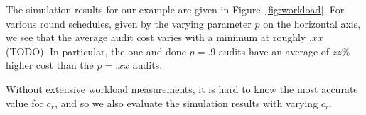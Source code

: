 The simulation results for our example are given in Figure~\ref{fig:workload}. 
For various round schedules, given by the varying parameter $p$ on the horizontal axis, we see that the average audit cost varies with a minimum at roughly $.xx$(TODO). In particular, the one-and-done $p=.9$ audits have an average of $zz\%$ higher cost than the $p=.xx$ audits.

Without extensive workload measurements, it is hard to know the most accurate value for $c_r$, and so we also evaluate the simulation results with varying $c_r$. 

